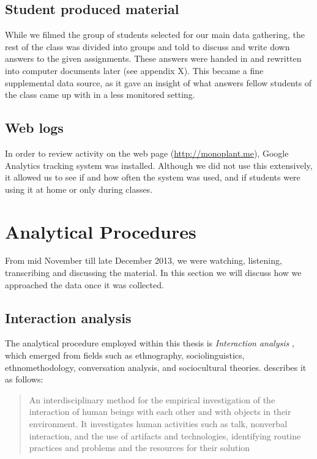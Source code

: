 \subsection{Student produced material}
While we filmed the group of students selected for our main data gathering, the rest of the class was divided into groups and told to discuss and write down answers to the given assignments. These answers were handed in and rewritten into computer documents later (see appendix X). This became a fine supplemental data source, as it gave an insight of what answers fellow students of the class came up with in a less monitored setting. 

\subsection{Web logs}
In order to review activity on the web page (\url{http://monoplant.me}), Google Analytics tracking system was installed. Although we did not use this extensively, it allowed us to see if and how often the system was used, and if students were using it at home or only during classes. 

\section{Analytical Procedures}
From mid November till late December 2013, we were watching, listening, transcribing and discussing the material. In this section we will discuss how we approached the data once it was collected.
\subsection{Interaction analysis}
The analytical procedure employed within this thesis is \emph{Interaction analysis} \citep{jordan1995interaction}, which emerged from fields such as ethnography, sociolinguistics, ethnomethodology, conversation analysis, and sociocultural theories. \citeauthor{jordan1995interaction} describes it as follows:

\begin{quote}
An interdisciplinary method for the empirical investigation of the interaction of human
beings with each other and with objects in their environment. It investigates human
activities such as talk, nonverbal interaction, and the use of artifacts and technologies,
identifying routine practices and problems and the resources for their solution \citep[p39]{jordan1995interaction}
\end{quote}

